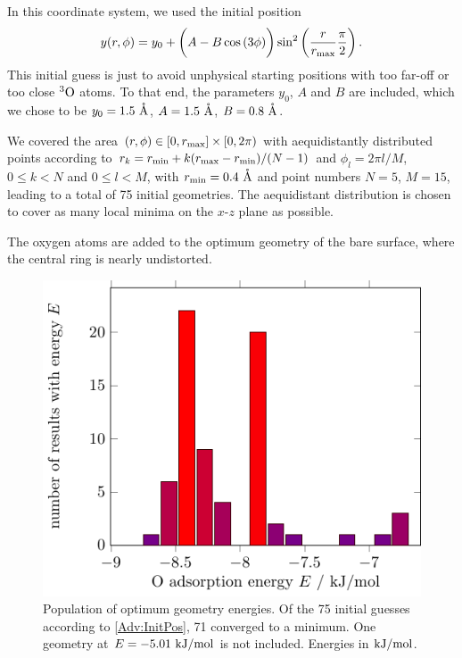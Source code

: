 \documentclass[8.5pt,twoside,twocolumn]{article}
\renewcommand{\Ang}{\mathring{\te{A}}}
\newcommand\tripo{\enmat{{^3\te{O}}}}
\newcommand\kmo{\enmat{\te {kJ/mol}}}
\theoremstyle{standard}
\begin{document}
In this coordinate system, we used the initial position
\begin{equation}
 y(r,\phi)=y_0+\left({\vphantom{\frac 1 2}  A-B\cos\left({3\phi}\right)}\right) \sin^2\left({\frac{r}{r_{\text{max}}}\frac\pi 2 }\right).
 \label{Adv:InitPos}
\end{equation}
This initial guess is
just to avoid unphysical starting positions with too far-off or too close $\tripo$
atoms. To that end, the parameters $y_0$, $A$ and $B$ are included, which we chose to be
$y_0=1.5~\Ang$, $A=1.5~\Ang$, $B=0.8~\Ang$.

We covered the area $(r,\phi) \in [0,r_{\text{max}}] \times [0, 2\pi)$ with aequidistantly
distributed points according to $r_k=r_{\text{min}}+k(r_{\text{max}}-r_{\text{min}})/(N-1)$ and $\phi_l=2\pi l/M$,
$0 \leq k < N$ and $0 \leq l < M$, with $\rmin=0.4~\Ang$ and point numbers
$N=5$, $M=15$, leading to a total of 75 initial geometries. The aequidistant
distribution is chosen to cover as many local minima on the $x$-$z$ plane as
possible.

The oxygen atoms are added to the optimum geometry of the bare surface, where
the central ring is nearly undistorted.

\begin{figure}[b!]
\includegraphics[width=.49\textwidth]{./TikzPics/TikzCreation/BindingEnergyDistribution/BindingEnergyDistribution.pdf}
\caption{Population of optimum geometry energies. Of the 75 initial guesses
according to \eqref{Adv:InitPos}, 71 converged to a minimum. One
geometry at $E=-5.01~\kmo$ is not included. Energies in $\kmo$.}
\label{Fig:Adv:BindingSitesEnergies}
\end{figure}
\end{document}
